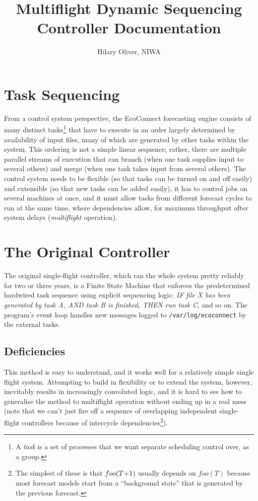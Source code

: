 \documentclass[11pt,a4paper]{report}
\title{Multiflight Dynamic Sequencing Controller Documentation}
\author{Hilary Oliver, NIWA}
\begin{document}
\maketitle
\tableofcontents

\chapter{Task Sequencing} 

From a control system perspective, the EcoConnect forecasting engine
consists of many distinct tasks\footnote{A {\em task} is a set of
processes that we want separate scheduling control over, as a group.}
that have to execute in an order largely determined by availability of
input files, many of which are generated by other tasks within the
system. This ordering is not a simple linear sequence; rather, there are
multiple parallel streams of execution that can branch (when one task
supplies input to several others) and merge (when one task takes input
from several others). The control system needs to be flexible (so that
tasks can be turned on and off easily) and extensible (so that new tasks
can be added easily), it has to control jobs on several machines at
once, and it must allow tasks from different forecast cycles to run at
the same time, where dependencies allow, for maximum throughput after
system delays ({\em multiflight} operation). 


\chapter{The Original Controller}

The original single-flight controller, which ran the whole system pretty
reliably for two or three years, is a Finite State Machine that enforces
the predetermined hardwired task sequence using explicit sequencing
logic: {\em IF file X has been generated by task A, AND task B is
finished, THEN run task C}, and so on. The program's event loop handles
new messages logged to \verb#/var/log/ecoconnect# by the external tasks.

\section{Deficiencies}

This method is easy to understand, and it works well for a relatively
simple single flight system.  Attempting to build in flexibility or to
extend the system, however, inevitably results in increasingly
convoluted logic, and it is hard to see how to generalise the method to
multiflight operation without ending up in a real mess (note that we
can't just fire off a sequence of overlapping independent single-flight
controllers because of intercycle dependencies\footnote{The simplest of
these is that $foo(T\negmedspace +\negmedspace 1)$ usually depends on
$foo(T)$ because most forecast models start from a ``background state''
that is generated by the previous forecast.}). 
\end{document}
